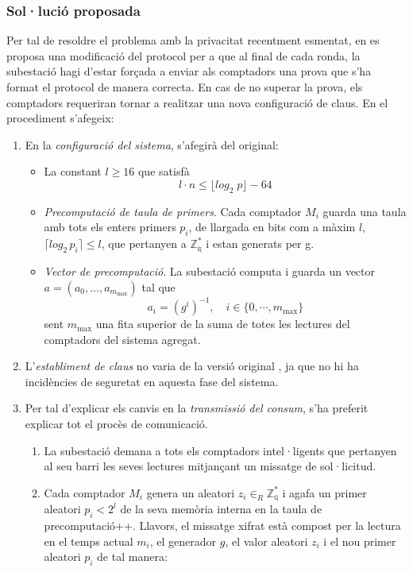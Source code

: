 \subsubsection{Sol·lució proposada}
Per tal de resoldre el problema amb la privacitat recentment esmentat, en \cite{repair-busom} es proposa una modificació del protocol per a que al final de cada ronda, la subestació hagi d'estar forçada a enviar als comptadors una prova que s'ha format el protocol de manera correcta. En cas de no superar la prova, els comptadors requeriran tornar a realitzar una nova configuració de claus. En el procediment s'afegeix:
\begin{enumerate}
	\item En la \textit{configuració del sistema}, s'afegirà del original:
	\begin{itemize}
		\item La constant $l \ge 16 $ que satisfà \[l \cdot n \le \lfloor log_2 \; p \rfloor - 64\]
		\item \textit{Precomputació de taula de primers}. Cada comptador $M_i$ guarda una taula amb tots els enters primers $p_i$, de llargada en bits com a màxim $l$, $\lceil log_2 \, p_i \rceil \le l$, que pertanyen a $\mathbb{Z_q^*}$ i estan generats per g.
		\item \textit{Vector de precomputació}. La subestació computa i guarda un vector $a = (a_0, \dots, a_{m_{\textrm{max}}})$ tal que \[a_i = (g^i)^{-1}, \quad i \in \{0, \cdots, m_{\textrm{max}}\}\] sent $m_{\textrm{max}}$ una fita superior de la suma de totes les lectures del comptadors del sistema agregat.
	\end{itemize}
	\item L'\textit{establiment de claus} no varia de la versió original \cite{busom}, ja que no hi ha incidències de seguretat en aquesta fase del sistema.
	\item Per tal d'explicar els canvis en la \textit{transmissió del consum}, s'ha preferit explicar tot el procès de comunicació.
	\begin{enumerate}
		\item La subestació demana a tots els comptadors intel·ligents que pertanyen al seu barri les seves lectures mitjançant un missatge de sol·licitud.
		\item Cada comptador $M_i$ genera un aleatori $z_i \in_R \mathbb{Z_q^*}$ i agafa un primer aleatori $p_i < 2^l$ de la seva memòria interna en la taula de precomputació++. Llavors, el missatge xifrat està compost per la lectura en el temps actual $m_i$, el generador $g$, el valor aleatori $z_i$ i el nou primer aleatori $p_i$ de tal manera:

\end{enumerate}
\end{enumerate}
